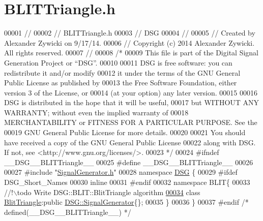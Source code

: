 \hypertarget{_b_l_i_t_triangle_8h_source}{\section{B\+L\+I\+T\+Triangle.\+h}
\label{_b_l_i_t_triangle_8h_source}
}

\begin{DoxyCode}
00001 \textcolor{comment}{//}
00002 \textcolor{comment}{//  BLITTriangle.h}
00003 \textcolor{comment}{//  DSG}
00004 \textcolor{comment}{//}
00005 \textcolor{comment}{//  Created by Alexander Zywicki on 9/17/14.}
00006 \textcolor{comment}{//  Copyright (c) 2014 Alexander Zywicki. All rights reserved.}
00007 \textcolor{comment}{//}
00008 \textcolor{comment}{/*}
00009 \textcolor{comment}{ This file is part of the Digital Signal Generation Project or “DSG”.}
00010 \textcolor{comment}{}
00011 \textcolor{comment}{ DSG is free software: you can redistribute it and/or modify}
00012 \textcolor{comment}{ it under the terms of the GNU General Public License as published by}
00013 \textcolor{comment}{ the Free Software Foundation, either version 3 of the License, or}
00014 \textcolor{comment}{ (at your option) any later version.}
00015 \textcolor{comment}{}
00016 \textcolor{comment}{ DSG is distributed in the hope that it will be useful,}
00017 \textcolor{comment}{ but WITHOUT ANY WARRANTY; without even the implied warranty of}
00018 \textcolor{comment}{ MERCHANTABILITY or FITNESS FOR A PARTICULAR PURPOSE.  See the}
00019 \textcolor{comment}{ GNU General Public License for more details.}
00020 \textcolor{comment}{}
00021 \textcolor{comment}{ You should have received a copy of the GNU General Public License}
00022 \textcolor{comment}{ along with DSG.  If not, see <http://www.gnu.org/licenses/>.}
00023 \textcolor{comment}{ */}
00024 \textcolor{preprocessor}{#ifndef \_\_DSG\_\_BLITTriangle\_\_}
00025 \textcolor{preprocessor}{#define \_\_DSG\_\_BLITTriangle\_\_}
00026 
00027 \textcolor{preprocessor}{#include "\hyperlink{_signal_generator_8h}{SignalGenerator.h}"}
00028 \textcolor{keyword}{namespace }\hyperlink{namespace_d_s_g}{DSG} \{
00029 \textcolor{preprocessor}{#ifdef DSG\_Short\_Names}
00030     \textcolor{keyword}{inline}
00031 \textcolor{preprocessor}{#endif}
00032     \textcolor{keyword}{namespace }BLIT\{\textcolor{comment}{}
00033 \textcolor{comment}{        //!\(\backslash\)todo Write DSG::BLIT::BlitTriangle algorithm}
\hypertarget{_b_l_i_t_triangle_8h_source_l00034}{}\hyperlink{class_d_s_g_1_1_b_l_i_t_1_1_blit_triangle}{00034} \textcolor{comment}{}        \textcolor{keyword}{class }\hyperlink{class_d_s_g_1_1_b_l_i_t_1_1_blit_triangle}{BlitTriangle}:\textcolor{keyword}{public} \hyperlink{class_d_s_g_1_1_signal_generator}{DSG::SignalGenerator}\{\};
00035     \}
00036 \}
00037 \textcolor{preprocessor}{#endif }\textcolor{comment}{/* defined(\_\_DSG\_\_BLITTriangle\_\_) */}\textcolor{preprocessor}{}
\end{DoxyCode}
